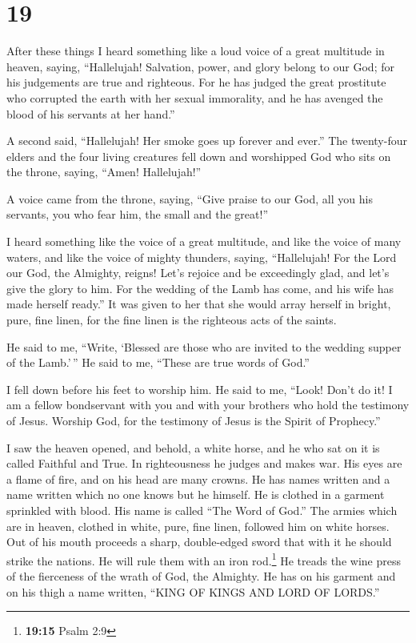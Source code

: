 \hypertarget{section-18}{%
\section{19}\label{section-18}}

 After these things I heard something like a loud voice of
a great multitude in heaven, saying, ``Hallelujah! Salvation, power, and
glory belong to our God;  for his judgements are true and
righteous. For he has judged the great prostitute who corrupted the
earth with her sexual immorality, and he has avenged the blood of his
servants at her hand.''

 A second said, ``Hallelujah! Her smoke goes up forever
and ever.''  The twenty-four elders and the four living
creatures fell down and worshipped God who sits on the throne, saying,
``Amen! Hallelujah!''

 A voice came from the throne, saying, ``Give praise to
our God, all you his servants, you who fear him, the small and the
great!''

 I heard something like the voice of a great multitude,
and like the voice of many waters, and like the voice of mighty
thunders, saying, ``Hallelujah! For the Lord our God, the Almighty,
reigns!  Let's rejoice and be exceedingly glad, and let's
give the glory to him. For the wedding of the Lamb has come, and his
wife has made herself ready.''  It was given to her that
she would array herself in bright, pure, fine linen, for the fine linen
is the righteous acts of the saints.

 He said to me, ``Write, `Blessed are those who are
invited to the wedding supper of the Lamb.'\,'' He said to me, ``These
are true words of God.''

 I fell down before his feet to worship him. He said to
me, ``Look! Don't do it! I am a fellow bondservant with you and with
your brothers who hold the testimony of Jesus. Worship God, for the
testimony of Jesus is the Spirit of Prophecy.''

 I saw the heaven opened, and behold, a white horse, and
he who sat on it is called Faithful and True. In righteousness he judges
and makes war.  His eyes are a flame of fire, and on his
head are many crowns. He has names written and a name written which no
one knows but he himself.  He is clothed in a garment
sprinkled with blood. His name is called ``The Word of God.''
 The armies which are in heaven, clothed in white, pure,
fine linen, followed him on white horses.  Out of his
mouth proceeds a sharp, double-edged sword that with it he should strike
the nations. He will rule them with an iron rod.\footnote{\textbf{19:15}
  Psalm 2:9} He treads the wine press of the fierceness of the wrath of
God, the Almighty.  He has on his garment and on his
thigh a name written, ``KING OF KINGS AND LORD OF LORDS.''

